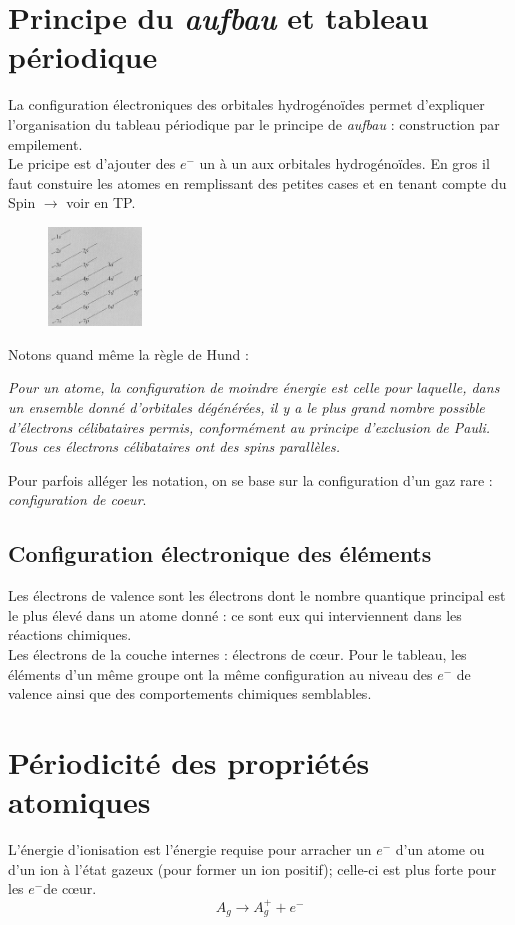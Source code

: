 \documentclass[british,french,11pt, a4paper, openany]{book}
\begin{document}
\section{Principe du \textit{aufbau} et tableau périodique}
La configuration électroniques des orbitales hydrogénoïdes permet d'expliquer l'organisation du tableau périodique par le principe de \textit{aufbau} : construction par empilement.\\
Le pricipe est d'ajouter des $e^-$ un à un aux orbitales hydrogénoïdes. En gros il faut constuire les atomes en remplissant des petites cases et en tenant compte du Spin $\rightarrow$ voir en TP.\\
\begin{figure}
	\includegraphics[width=2.5cm]{image6.png}
\end{figure}
Notons quand même la règle de Hund : 

\textit{Pour un atome, la configuration de moindre énergie est celle pour laquelle, dans un ensemble donné d'orbitales dégénérées, il y a le plus grand nombre possible d'électrons célibataires permis, conformément au principe d'exclusion de Pauli. Tous ces électrons célibataires ont des spins parallèles.}

Pour parfois alléger les notation, on se base sur la configuration d'un gaz rare : \textit{configuration de coeur}.

\subsection{Configuration électronique des éléments}
Les électrons de valence sont les électrons dont le nombre quantique principal est le plus élevé dans un atome donné : ce sont eux qui interviennent dans les réactions chimiques.\\
Les électrons de la couche internes : électrons de cœur. Pour le tableau, les éléments d'un même groupe ont la même configuration au niveau des $e^-$ de valence ainsi que des comportements chimiques semblables.

\section{Périodicité des propriétés atomiques}
L'énergie d'ionisation est l'énergie requise pour arracher un $e^-$ d'un atome ou d'un ion à l'état gazeux  (pour former un ion positif); celle-ci est plus forte pour les $e^-$de cœur.
$$A_g \rightarrow A_g^+ + e^-$$
\end{document}
